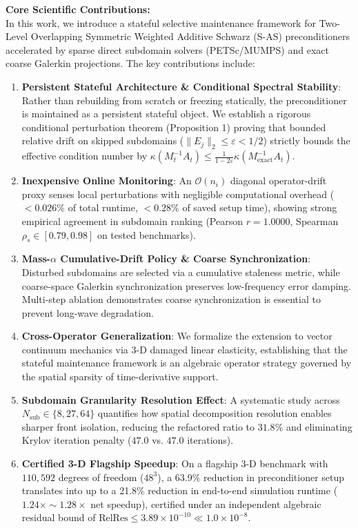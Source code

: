 \documentclass[11pt,a4paper]{article}
\begin{document}
\vspace{0.8em}
\noindent
\textbf{Core Scientific Contributions:}\\
In this work, we introduce a stateful selective maintenance framework for Two-Level Overlapping Symmetric Weighted Additive Schwarz (S-AS) preconditioners accelerated by sparse direct subdomain solvers (PETSc/MUMPS) and exact coarse Galerkin projections. The key contributions include:
\begin{enumerate}
    \item \textbf{Persistent Stateful Architecture \& Conditional Spectral Stability}: Rather than rebuilding from scratch or freezing statically, the preconditioner is maintained as a persistent stateful object. We establish a rigorous conditional perturbation theorem (Proposition 1) proving that bounded relative drift on skipped subdomains ($\|E_j\|_2 \le \varepsilon < 1/2$) strictly bounds the effective condition number by $\kappa(M_t^{-1} A_t) \le \frac{1}{1-2\varepsilon} \kappa(M_{\text{exact}}^{-1} A_t)$.
    \item \textbf{Inexpensive Online Monitoring}: An $\mathcal{O}(n_i)$ diagonal operator-drift proxy senses local perturbations with negligible computational overhead ($< 0.026\%$ of total runtime, $< 0.28\%$ of saved setup time), showing strong empirical agreement in subdomain ranking (Pearson $r = 1.0000$, Spearman $\rho_s \in [0.79, 0.98]$ on tested benchmarks).
    \item \textbf{Mass-$\alpha$ Cumulative-Drift Policy \& Coarse Synchronization}: Disturbed subdomains are selected via a cumulative staleness metric, while coarse-space Galerkin synchronization preserves low-frequency error damping. Multi-step ablation demonstrates coarse synchronization is essential to prevent long-wave degradation.
    \item \textbf{Cross-Operator Generalization}: We formalize the extension to vector continuum mechanics via 3-D damaged linear elasticity, establishing that the stateful maintenance framework is an algebraic operator strategy governed by the spatial sparsity of time-derivative support.
    \item \textbf{Subdomain Granularity Resolution Effect}: A systematic study across $N_{\text{sub}} \in \{8, 27, 64\}$ quantifies how spatial decomposition resolution enables sharper front isolation, reducing the refactored ratio to $31.8\%$ and eliminating Krylov iteration penalty ($47.0$ vs. $47.0$ iterations).
    \item \textbf{Certified 3-D Flagship Speedup}: On a flagship 3-D benchmark with $110,592$ degrees of freedom ($48^3$), a 63.9\% reduction in preconditioner setup translates into up to a 21.8\% reduction in end-to-end simulation runtime ($1.24\times \sim 1.28\times$ net speedup), certified under an independent algebraic residual bound of $\text{RelRes} \le 3.89 \times 10^{-10} \ll 1.0 \times 10^{-8}$.
\end{enumerate}
\end{document}
